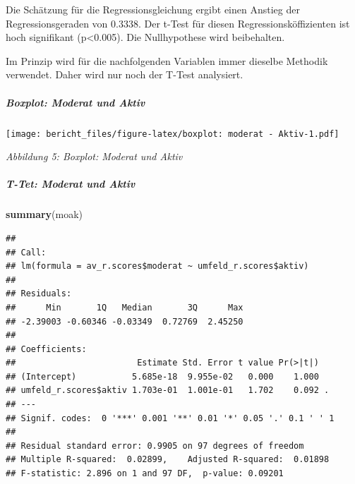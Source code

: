 \documentclass[]{article}
\newenvironment{Shaded}{\begin{snugshade}}{\end{snugshade}}
\newcommand{\KeywordTok}[1]{\textcolor[rgb]{0.13,0.29,0.53}{\textbf{{#1}}}}
\newcommand{\DataTypeTok}[1]{\textcolor[rgb]{0.13,0.29,0.53}{{#1}}}
\newcommand{\StringTok}[1]{\textcolor[rgb]{0.31,0.60,0.02}{{#1}}}
\newcommand{\NormalTok}[1]{{#1}}
\let\oldsubparagraph\subparagraph
\renewcommand{\subparagraph}[1]{\oldsubparagraph{#1}\mbox{}}
\begin{document}
Die Schätzung für die Regressionsgleichung ergibt einen Anstieg der
Regressionsgeraden von 0.3338. Der t-Test für diesen
Regressionsköffizienten ist hoch signifikant (p\textless{}0.005). Die
Nullhypothese wird beibehalten.

Im Prinzip wird für die nachfolgenden Variablen immer dieselbe Methodik
verwendet. Daher wird nur noch der T-Test analysiert.

\subparagraph{Boxplot: Moderat und
Aktiv}\label{boxplot-moderat-und-aktiv}

\begin{Shaded}
\end{Shaded}

\texttt{[image: bericht\_files/figure-latex/boxplot: moderat - Aktiv-1.pdf]}

\begin{center}
\textit{Abbildung 5: Boxplot: Moderat und Aktiv}
\bigskip
\end{center}

\subparagraph{T-Tet: Moderat und Aktiv}\label{t-tet-moderat-und-aktiv}

\begin{Shaded}
\begin{Highlighting}[]
\KeywordTok{summary}\NormalTok{(moak)}
\end{Highlighting}
\end{Shaded}

\begin{verbatim}
## 
## Call:
## lm(formula = av_r.scores$moderat ~ umfeld_r.scores$aktiv)
## 
## Residuals:
##      Min       1Q   Median       3Q      Max 
## -2.39003 -0.60346 -0.03349  0.72769  2.45250 
## 
## Coefficients:
##                        Estimate Std. Error t value Pr(>|t|)  
## (Intercept)           5.685e-18  9.955e-02   0.000    1.000  
## umfeld_r.scores$aktiv 1.703e-01  1.001e-01   1.702    0.092 .
## ---
## Signif. codes:  0 '***' 0.001 '**' 0.01 '*' 0.05 '.' 0.1 ' ' 1
## 
## Residual standard error: 0.9905 on 97 degrees of freedom
## Multiple R-squared:  0.02899,    Adjusted R-squared:  0.01898 
## F-statistic: 2.896 on 1 and 97 DF,  p-value: 0.09201
\end{verbatim}
\end{document}
